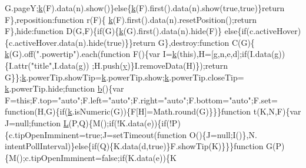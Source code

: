 \begin{DoxyCode}
{      G.pageY;\hyperlink{jquery_8js_ab26645c014aa005ecedef329ecf58c99}{k}(F).data(n).show()\}\textcolor{keywordflow}{else}\{\hyperlink{jquery_8js_ab26645c014aa005ecedef329ecf58c99}{k}(F).first().data(n).show(\textcolor{keyword}{true},\textcolor{keyword}{true})\}\textcolor{keywordflow}{return} F\},reposition:\textcolor{keyword}{function} r(F)\{
      \hyperlink{jquery_8js_ab26645c014aa005ecedef329ecf58c99}{k}(F).first().data(n).resetPosition();\textcolor{keywordflow}{return} F\},hide:\textcolor{keyword}{function} D(G,F)\{\textcolor{keywordflow}{if}(G)\{\hyperlink{jquery_8js_ab26645c014aa005ecedef329ecf58c99}{k}(G).first().data(n).hide(F)\}\textcolor{keywordflow}{
      else}\{\textcolor{keywordflow}{if}(c.activeHover)\{c.activeHover.data(n).hide(\textcolor{keyword}{true})\}\}\textcolor{keywordflow}{return} G\},destroy:\textcolor{keyword}{function} C(G)\{
      \hyperlink{jquery_8js_ab26645c014aa005ecedef329ecf58c99}{k}(G).off(\textcolor{stringliteral}{".powertip"}).each(\textcolor{keyword}{function} F()\{var I=\hyperlink{jquery_8js_ab26645c014aa005ecedef329ecf58c99}{k}(\textcolor{keyword}{this}),H=[g,n,e,d];\textcolor{keywordflow}{if}(I.data(g))\{I.attr(\textcolor{stringliteral}{"title"},I.data(g))
      ;H.push(\hyperlink{sensor_8h_a0ed6a908288e0cd87f79c1b5ab56d07c}{y})\}I.removeData(H)\});\textcolor{keywordflow}{return} G\}\};\hyperlink{jquery_8js_ab26645c014aa005ecedef329ecf58c99}{k}.powerTip.showTip=\hyperlink{jquery_8js_ab26645c014aa005ecedef329ecf58c99}{k}.powerTip.show;\hyperlink{jquery_8js_ab26645c014aa005ecedef329ecf58c99}{k}.powerTip.closeTip=
      \hyperlink{jquery_8js_ab26645c014aa005ecedef329ecf58c99}{k}.powerTip.hide;\textcolor{keyword}{function} \hyperlink{jquery_8js_aa4026ad5544b958e54ce5e106fa1c805}{b}()\{var F=\textcolor{keyword}{this};F.top=\textcolor{stringliteral}{"auto"};F.left=\textcolor{stringliteral}{"auto"};F.right=\textcolor{stringliteral}{"auto"};F.bottom=\textcolor{stringliteral}{"auto"};F.set=\textcolor{keyword}{
      function}(H,G)\{\textcolor{keywordflow}{if}(\hyperlink{jquery_8js_ab26645c014aa005ecedef329ecf58c99}{k}.isNumeric(G))\{F[H]=Math.round(G)\}\}\}\textcolor{keyword}{function} t(K,N,F)\{var J=null;\textcolor{keyword}{function} 
      \hyperlink{jquery_8js_a38ee4c0b5f4fe2a18d0c783af540d253}{L}(P,Q)\{M();\textcolor{keywordflow}{if}(!K.data(e))\{\textcolor{keywordflow}{if}(!P)\{c.tipOpenImminent=\textcolor{keyword}{true};J=setTimeout(\textcolor{keyword}{function} O()\{J=null;I()\},N.
      intentPollInterval)\}\textcolor{keywordflow}{else}\{\textcolor{keywordflow}{if}(Q)\{K.data(d,\textcolor{keyword}{true})\}F.showTip(K)\}\}\}\textcolor{keyword}{function} G(P)\{M();c.tipOpenImminent=\textcolor{keyword}{false};\textcolor{keywordflow}{if}(K.data(e))\{K
}
\end{DoxyCode}
